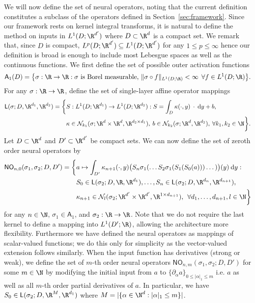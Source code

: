 We will now define the set of neural operators, noting that the current definition constitutes a subclass of the operators defined in Section~\ref{sec:framework}. Since our framework rests on kernel integral transforms, it is natural to define the method on inputs in \(L^1(D;\R^{d'})\) where \(D \subset \R^d\) is a compact set. We remark that, since \(D\) is compact, \(L^p(D;\R^{d'}) \subseteq L^1(D;\R^{d'})\) for any \(1 \leq p \leq \infty\) hence our definition is broad is enough to include most Lebesgue spaces as well as the continuous functions. We first define the set of possible outer activation functions
\[\mathsf{A}_1(D) = \big \{\sigma : \R \to \R : \sigma \text{ is Borel measurable, } \|\sigma \circ f \|_{L^1(D;\R)} < \infty \:\: \forall f \in L^1(D;\R) \big \}.\]
For any \(\sigma : \R \to \R\), define the set of single-layer affine operator mappings
\begin{align*}
    \mathsf{L}(\sigma;D,\R^{d_1},\R^{d_2}) = \bigg \{&S : L^1(D;\R^{d_1}) \to L^1(D;\R^{d_2}) : S = \int_D \kappa(\cdot, y) \: \cdot \: \text{d}y + b,  \\
    &\kappa \in \mathcal{N}_{k_1}(\sigma;\R^{d} \times \R^{d}, \R^{d_2 \times d_1}), \: b \in \mathcal{N}_{k_2}(\sigma;\R^{d}, \R^{d_2}), \: \forall k_1, k_2 \in \N \bigg \}.
\end{align*}
Let \(D \subset \R^d\) and \(D' \subset \R^{d'}\) be compact sets. We can now define the set of zeroth order neural operators by
\begin{align*}
\mathsf{NO}_{n,0}(\sigma_1, \sigma_2; D, D') = \bigg \{ &a \mapsto \int_{D'} \kappa_{n+1}(\cdot,y) \big ( S_n \sigma_1 ( \dots S_2 \sigma_1 (S_1 ( S_0(a))) \dots) \big) (y) \: \text{d}y : \\
&S_0 \in \mathsf{L}(\sigma_2;D,\R,\R^{d_1}), \dots, S_n \in \mathsf{L}(\sigma_2;D,\R^{d_{n}},\R^{d_{n+1}}), \\ &\kappa_{n+1} \in \mathcal{N}_l(\sigma_2;\R^{d'} \times \R^{d'}, \R^{1 \times d_{n+1}}), \:\: \forall d_1,\dots,d_{n+1}, l \in \N
\bigg \}
\end{align*}
for any \(n \in \N\),  \(\sigma_1 \in \mathsf{A}_1\), and \(\sigma_2 : \R \to \R\). Note that we do not require the last kernel to define a mapping into \(L^1(D';\R)\), allowing the architecture more flexibility. Furthermore we have defined the neural operators as mappings of scalar-valued functions; we do this only for simplicity as the vector-valued extension follows similarly. When the input function has derivatives (strong or weak), we define the set of \(m\)-th order neural operators \(\mathsf{NO}_{n,m}(\sigma_1, \sigma_2; D, D')\) for some \(m \in \N\) by modifying the initial input from \(a\) to
\(\{\partial_\alpha a\}_{0 \leq |\alpha|_1 \leq m}\) i.e. \(a\) as well as all \(m\)-th order partial derivatives of \(a\). In particular, we have \(S_0 \in \mathsf{L}(\sigma_2; D,\R^M,\R^{d_1})\) where \(M = |\{\alpha \in \N^d : |\alpha|_1 \leq m\}|\).

